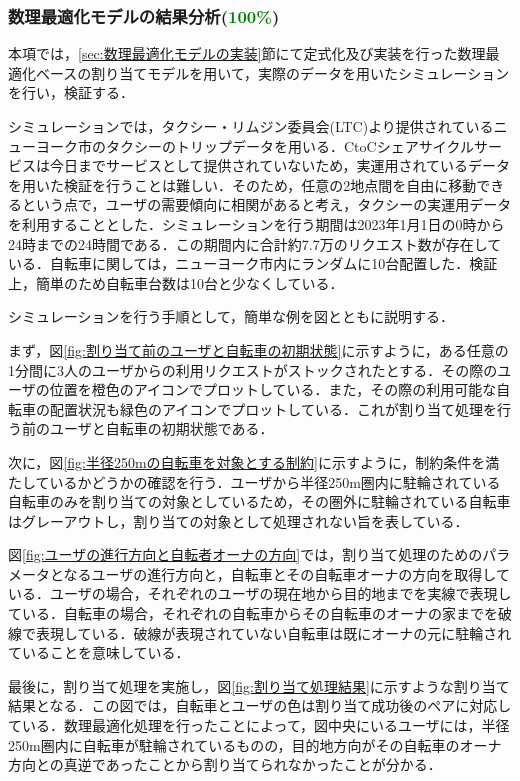       \subsubsection{数理最適化モデルの結果分析(\textcolor{green}{100\%})}
        \label{sec:数理最適化モデルの結果分析}
          \par 本項では，\ref{sec:数理最適化モデルの実装}節にて定式化及び実装を行った数理最適化ベースの割り当てモデルを用いて，実際のデータを用いたシミュレーションを行い，検証する．
          \par シミュレーションでは，タクシー・リムジン委員会(LTC)より提供されているニューヨーク市のタクシーのトリップデータを用いる．CtoCシェアサイクルサービスは今日までサービスとして提供されていないため，実運用されているデータを用いた検証を行うことは難しい．そのため，任意の2地点間を自由に移動できるという点で，ユーザの需要傾向に相関があると考え，タクシーの実運用データを利用することとした．シミュレーションを行う期間は2023年1月1日の0時から24時までの24時間である．この期間内に合計約7.7万のリクエスト数が存在している．自転車に関しては，ニューヨーク市内にランダムに10台配置した．検証上，簡単のため自転車台数は10台と少なくしている．
          \par シミュレーションを行う手順として，簡単な例を図とともに説明する．
          \par まず，図\ref{fig:割り当て前のユーザと自転車の初期状態}に示すように，ある任意の1分間に3人のユーザからの利用リクエストがストックされたとする．その際のユーザの位置を橙色のアイコンでプロットしている．また，その際の利用可能な自転車の配置状況も緑色のアイコンでプロットしている．これが割り当て処理を行う前のユーザと自転車の初期状態である．
          \par 次に，図\ref{fig:半径250mの自転車を対象とする制約}に示すように，制約条件を満たしているかどうかの確認を行う．ユーザから半径250m圏内に駐輪されている自転車のみを割り当ての対象としているため，その圏外に駐輪されている自転車はグレーアウトし，割り当ての対象として処理されない旨を表している．
          \par 図\ref{fig:ユーザの進行方向と自転者オーナの方向}では，割り当て処理のためのパラメータとなるユーザの進行方向と，自転車とその自転車オーナの方向を取得している．ユーザの場合，それぞれのユーザの現在地から目的地までを実線で表現している．自転車の場合，それぞれの自転車からその自転車のオーナの家までを破線で表現している．破線が表現されていない自転車は既にオーナの元に駐輪されていることを意味している．
          \par 最後に，割り当て処理を実施し，図\ref{fig:割り当て処理結果}に示すような割り当て結果となる．この図では，自転車とユーザの色は割り当て成功後のペアに対応している．数理最適化処理を行ったことによって，図中央にいるユーザには，半径250m圏内に自転車が駐輪されているものの，目的地方向がその自転車のオーナ方向との真逆であったことから割り当てられなかったことが分かる．
